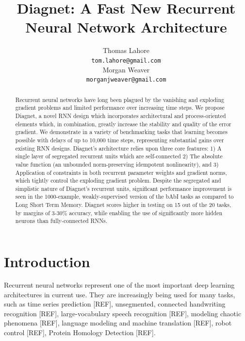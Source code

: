 \documentclass{article}
\title{Diagnet: A Fast New Recurrent Neural Network Architecture}
\author{
Thomas Lahore\\
\texttt{tom.lahore@gmail.com}\\
\And
Morgan Weaver\\
\texttt{morganjweaver@gmail.com}
}
\begin{document}
\maketitle
\begin{abstract}

  Recurrent neural networks have long been plagued by the vanishing and exploding gradient problems and limited performance over increasing time steps. We propose Diagnet, a novel RNN design which incorporates architectural and process-oriented elements which, in combination, greatly increase the stability and quality of the error gradient. We demonstrate in a variety of benchmarking tasks that learning becomes possible with delays of up to 10,000 time steps, representing substantial gains over existing RNN designs.  Diagnet’s architecture relies upon three core features: 1) A single layer of segregated recurrent units which are self-connected 2) The absolute value function (an unbounded norm-preserving idempotent nonlinearity), and 3) Application of constraints in both recurrent parameter weights and gradient norms, which tightly control the exploding gradient problem.  Despite the segregated and simplistic nature of Diagnet's recurrent units, significant performance improvement is seen in the 1000-example, weakly-supervised version of the bAbI tasks as compared to Long Short Term Memory. Diagnet scores higher in testing on 15 out of the 20 tasks, by margins of 3-30\% accuracy, while enabling the use of significantly more hidden neurons than fully-connected RNNs. 

\end{abstract}

\section{Introduction}

%
Recurrent neural networks represent one of the most important deep learning architectures in current use.  They are increasingly being used for many tasks, such as time series prediction [REF], unsegmented, connected handwriting recognition [REF], large-vocabulary speech recognition [REF], modeling chaotic phenomena [REF], language modeling and machine translation [REF], robot control [REF], Protein Homology Detection [REF].
 
\end{document}
